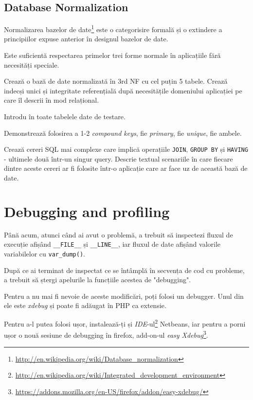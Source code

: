 \subsection{Database Normalization}
Normalizarea bazelor de date\footnote{\url{http://en.wikipedia.org/wiki/Database_normalization}}
este o categorisire formală și o 
extindere a principiilor expuse anterior în designul bazelor de date.

Este suficientă respectarea primelor trei forme normale în aplicațiile
fără necesități speciale.

\begin{Exercise}[title={Database Normalization}, difficulty=3]
Crează o bază de date normalizată în 3rd NF cu cel puțin 5 tabele. Crează indecși unici
și integritate referențială după necesitățile domeniului aplicației pe care îl
descrii în mod relațional.

Introdu în toate tabelele date de testare.

Demonstrează folosirea a 1-2 \textsl{compound keys}, fie \textsl{primary},
fie \textsl{unique}, fie ambele.

Crează cereri SQL mai complexe care implică operațiile \texttt{JOIN},
\texttt{GROUP BY} și \texttt{HAVING} - ultimele două într-un singur query.
Descrie textual scenariile în care fiecare dintre aceste cereri ar
fi folosite într-o aplicație care ar face uz de această bază de date.
\end{Exercise}

\section{Debugging and profiling}
Până acum, atunci când ai avut o problemă, a trebuit să inspectezi
fluxul de execuție afișând \texttt{\_\_FILE\_\_} și \texttt{\_\_LINE\_\_},
iar fluxul de date afișând valorile variabilelor cu \texttt{var\_dump()}.

După ce ai terminat de inspectat ce se întâmplă în secvența de cod cu probleme,
a trebuit să ștergi apelurile la funcțiile acestea de "debugging".

Pentru a nu mai fi nevoie de aceste modificări, poți folosi un debugger. 
Unul din ele este \textsl{xdebug} și poate
fi adăugat în PHP ca extensie.

Pentru a-l putea folosi ușor, instalează-ți și
\textsl{IDE}-ul\footnote{\url{http://en.wikipedia.org/wiki/Integrated_development_environment}}
Netbeans, iar pentru a porni ușor o nouă sesiune de debugging în firefox,
add-on-ul \textit{easy Xdebug}\footnote{\url{https://addons.mozilla.org/en-US/firefox/addon/easy-xdebug/}}.


